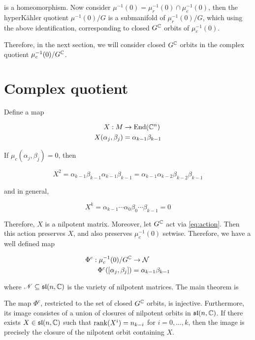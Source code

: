 \documentclass{article}
\renewcommand{\sl}{\mathfrak{sl}}
\begin{document}
is a homeomorphism. Now consider \(\mu^{-1}(0) = \mu_r^{-1}(0) \cap \mu_c^{-1}(0)\), then the hyperK\"ahler quotient \(\mu^{-1}(0)/G\) is a submanifold of \(\mu_r^{-1}(0)/G\), which using the above identification, corresponding to closed \(G^{\mathbb{C}}\) orbits of \(\mu_c^{-1}(0)\).

Therefore, in the next section, we will consider closed \(G^{\mathbb{C}}\) orbits in the complex quotient \(\mu_c^{-1}(0)/G^{\mathbb{C}}\).

\section{Complex quotient}

Define a map

\begin{align*}
    X : M &\to \operatorname{End}(\mathbb{C}^n) \\
    X(\alpha_j, \beta_j) &= \alpha_{k-1}\beta_{k-1}
\end{align*}

If \(\mu_c(\alpha_j, \beta_j) = 0\), then

\[X^2 = \alpha_{k-1}\beta_{k-1}\alpha_{k-1}\beta_{k-1} = \alpha_{k-1}\alpha_{k-2}\beta_{k-2}\beta_{k-1}\]

and in general,

\[X^k = \alpha_{k-1}\cdots \alpha_0\beta_0\cdots \beta_{k-1} = 0\]

Therefore, \(X\) is a nilpotent matrix. Moreover, let \(G^{\mathbb{C}}\) act via \cref{eq:action}. Then this action preserves \(X\), and also preserves \(\mu_c^{-1}(0)\) setwise. Therefore, we have a well defined map

\begin{align*}
    \Phi^c : \mu_c^{-1}(0)/G^{\mathbb{C}} &\to \mathcal{N} \\
    \Phi^c([\alpha_j, \beta_j]) &= \alpha_{k-1}\beta_{k-1}
\end{align*}

where \(\msN \subseteq \sl(n, \C)\) is the variety of nilpotent matrices. The main theorem is

\begin{theorem}
    The map \(\Phi^c\), restricted to the set of closed \(G^{\mathbb{C}}\) orbits, is injective. Furthermore, its image consistes of a union of closures of nilpotent orbits in \(\sl(n, \C)\). If there exists \(X \in \sl(n, \C)\) such that \(\rank(X^i) = n_{k-i}\) for \(i = 0, \dots, k\), then the image is precisely the closure of the nilpotent orbit containing \(X\).
\end{theorem}
\end{document}
